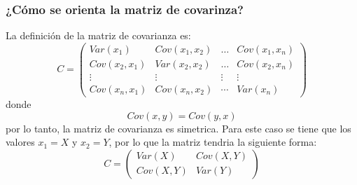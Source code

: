 \subsubsection*{¿Cómo se orienta la matriz de covarinza?}
La definición de la matriz de covarianza es:
\begin{equation*}
    C= \begin{pmatrix}
        Var(x_1)     & Cov(x_1,x_2) & \dots  & Cov(x_1,x_n) \\
        Cov(x_2,x_1) & Var(x_2,x_2) & \dots  & Cov(x_2,x_n) \\
        \vdots       & \vdots       & \vdots & \vdots       \\
        Cov(x_n,x_1) & Cov(x_n,x_2) & \cdots & Var(x_n)
    \end{pmatrix}
\end{equation*}
donde
\begin{equation*}
    Cov(x,y)= Cov(y,x)
\end{equation*}
por lo tanto, la matriz de covarianza es simetrica. Para este caso se tiene que los valores $x_1=X$ y $x_2=Y$, por lo que la matriz tendria la siguiente forma:
\begin{equation*}
    C=\begin{pmatrix}
        Var(X)   & Cov(X,Y) \\
        Cov(X,Y) & Var(Y)
    \end{pmatrix}
\end{equation*}